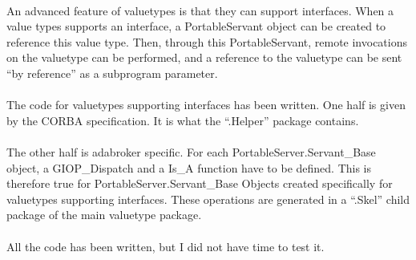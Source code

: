 \paragraph{}An advanced feature of valuetypes is that they can support
interfaces. When a value types supports an interface, a PortableServant
object can be created to reference this value type. Then, through this
PortableServant, remote invocations on the valuetype can be performed,
and a reference to the valuetype can be sent ``by reference'' as a
subprogram parameter.

\paragraph{}The code for valuetypes supporting interfaces has been
written. One half is given by the CORBA specification. It is what the
``.Helper'' package contains.

\paragraph{}The other half is adabroker specific. For each
PortableServer.Servant\_Base object, a \linebreak GIOP\_Dis\-patch and a Is\_A
function have to be defined. This is therefore true for
PortableServer.Servant\_Base Objects created specifically for
valuetypes supporting interfaces. These operations are generated in a
``.Skel'' child package of the main valuetype package.

\paragraph{}All the code has been written, but I did not have time to
test it.
